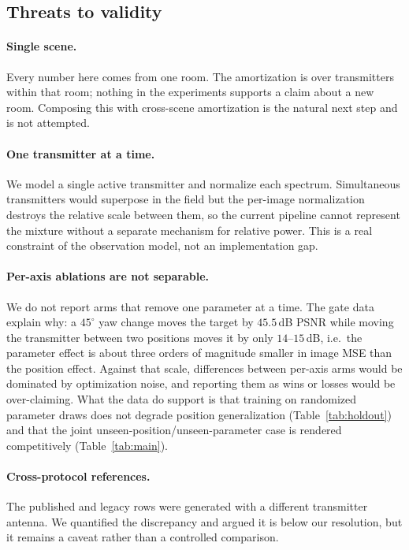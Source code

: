 \documentclass[conference]{IEEEtran}
\begin{document}
\subsection{Threats to validity}
\label{sec:disc}

\paragraph{Single scene.} Every number here comes from one room. The
amortization is over transmitters within that room; nothing in the experiments
supports a claim about a new room. Composing this with cross-scene
amortization \cite{corf} is the natural next step and is not attempted.

\paragraph{One transmitter at a time.} We model a single active transmitter and
normalize each spectrum. Simultaneous transmitters would superpose in the field
but the per-image normalization destroys the relative scale between them, so
the current pipeline cannot represent the mixture without a separate mechanism
for relative power. This is a real constraint of the observation model, not an
implementation gap.

\paragraph{Per-axis ablations are not separable.} We do not report arms that
remove one parameter at a time. The gate data explain why: a $45^\circ$ yaw
change moves the target by $45.5$\,dB PSNR while moving the transmitter between
two positions moves it by only $14$--$15$\,dB, i.e.\ the parameter effect is
about three orders of magnitude smaller in image MSE than the position effect.
Against that scale, differences between per-axis arms would be dominated by
optimization noise, and reporting them as wins or losses would be
over-claiming. What the data do support is that training on randomized
parameter draws does not degrade position generalization (Table~\ref{tab:holdout})
and that the joint unseen-position/unseen-parameter case is rendered
competitively (Table~\ref{tab:main}).

\paragraph{Cross-protocol references.} The published and legacy rows were
generated with a different transmitter antenna. We quantified the discrepancy
and argued it is below our resolution, but it remains a caveat rather than a
controlled comparison.
\end{document}

